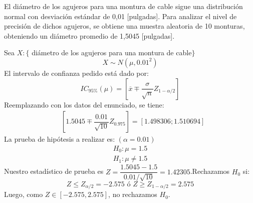 \addpoints
\question[15] El di\'ametro de los agujeros para una montura de cable sigue una distribuci\'on normal con desviaci\'on est\'andar de 0,01 [pulgadas]. Para analizar el nivel de precisi\'on de dichos agujeros, se obtiene una muestra aleatoria de 10 monturas, obteniendo un di\'ametro promedio de 1,5045 [pulgadas].\noaddpoints{}

\begin{solution}
Sea $X:\{$ di\'ametro de los agujeros para una montura de cable$\}$$$X\sim N(\mu,0.01^2) $$El intervalo de confianza pedido est\'a dado por:$$IC_{95\%}(\mu)=\left[ \overline{x} \mp \dfrac{\sigma}{\sqrt{n}} Z_{1-\alpha/2} \right]$$Reemplazando con los datos del enunciado, se tiene:\begin{align*}&\left[ 1.5045 \mp \dfrac{0.01}{\sqrt{10}}Z_{0.975}\right]=  \left[ 1.498306 ; 1.510694\right] \end{align*}La prueba de hip\'otesis a realizar es: $(\alpha=0.01)$\begin{align*}H_0: \mu=1.5 \\H_1: \mu \neq 1.5\end{align*}Nuestro estad\'istico de prueba es $Z=\dfrac{1.5045-1.5}{0.01/\sqrt{10}}=1.42305$.Rechazamos $H_0$ si:$$ Z \leq Z_{\alpha/2}=-2.575 \text{ \'o } Z \geq Z_{1-\alpha/2}=2.575 $$Luego, como $Z\in [-2.575,2.575]$, no rechazamos $H_0$.
\end{solution}